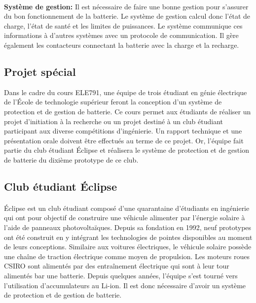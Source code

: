 		
		\paragraph{}
		\textbf{Système de gestion:} Il est nécessaire de faire une bonne gestion pour s'assurer du bon fonctionnement de la batterie. Le système de gestion calcul donc l'état de charge, l'état de santé et les limites de puissances. Le système communique ces informations à d'autres systèmes avec un protocole de communication. Il gère également les contacteurs connectant la batterie avec la charge et la recharge.
	
	
	\subsection{Projet spécial}
	Dans le cadre du cours ELE791, une équipe de trois étudiant en génie électrique de l'École de technologie supérieur feront la conception d'un système de protection et de gestion de batterie. Ce cours permet aux étudiants de réaliser un projet d'initiation à la recherche ou un projet destiné à un club étudiant participant aux diverse compétitions d'ingénierie. Un rapport technique et une présentation orale doivent être effectués au terme de ce projet. Or, l'équipe fait partie du club étudiant Éclipse et réalisera le système de protection et de gestion de batterie du dixième prototype de ce club.
	
		
	\subsection{Club étudiant Éclipse}
	
		\paragraph{}
		Éclipse est un club étudiant composé d'une quarantaine d'étudiants en ingénierie qui ont pour objectif de construire une véhicule alimenter par l'énergie solaire à l'aide de panneaux photovoltaïques. Depuis sa fondation en 1992, neuf prototypes ont été construit en y intégrant les technologies de pointes disponibles au moment de leurs conceptions. Similaire aux voitures électriques, le véhicule solaire possède une chaîne de traction électrique comme moyen de propulsion. Les moteurs roues  CSIRO sont alimentés par des entraînement électrique qui sont à leur tour alimentés bar une batterie. Depuis quelques années, l'équipe s'est tourné vers l'utilisation d'accumulateurs au Li-ion. Il est donc nécessaire d'avoir un système de protection et de gestion de batterie.
		
